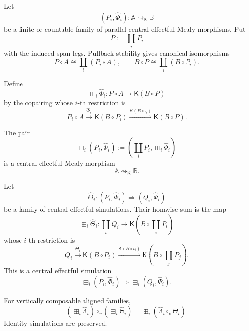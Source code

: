 Let
\[
    (P_i,\widehat\Phi_i):
    \mathbb A\rightsquigarrow_{\mathsf K}\mathbb B
\]
be a finite or countable family of parallel central effectful Mealy
morphisms.  Put
\[
    P:=\coprod_iP_i
\]
with the induced span legs.  Pullback stability gives canonical
isomorphisms
\[
    P\circ A
    \cong
    \coprod_i(P_i\circ A),
    \qquad
    B\circ P
    \cong
    \coprod_i(B\circ P_i).
\]

Define
\[
    \boxplus_i\widehat\Phi_i:
    P\circ A
    \longrightarrow
    \mathsf K(B\circ P)
\]
by the copairing whose \(i\)-th restriction is
\[
    P_i\circ A
    \xrightarrow{\widehat\Phi_i}
    \mathsf K(B\circ P_i)
    \xrightarrow{\mathsf K(B\circ\iota_i)}
    \mathsf K(B\circ P).
\]

\begin{proposition}
\label{prop:homwise-sums-effectful-mealy}
The pair
\[
    \boxplus_i(P_i,\widehat\Phi_i)
    :=
    \left(
        \coprod_iP_i,
        \boxplus_i\widehat\Phi_i
    \right)
\]
is a central effectful Mealy morphism
\[
    \mathbb A\rightsquigarrow_{\mathsf K}\mathbb B.
\]

Let
\[
    \widehat\Theta_i:
    (P_i,\widehat\Phi_i)
    \Rightarrow
    (Q_i,\widehat\Psi_i)
\]
be a family of central effectful simulations.  Their homwise sum is the map
\[
    \boxplus_i\widehat\Theta_i:
    \coprod_iQ_i
    \longrightarrow
    \mathsf K
    \left(
        B\circ\coprod_iP_i
    \right)
\]
whose \(i\)-th restriction is
\[
    Q_i
    \xrightarrow{\widehat\Theta_i}
    \mathsf K(B\circ P_i)
    \xrightarrow{\mathsf K(B\circ\iota_i)}
    \mathsf K
    \left(
        B\circ\coprod_jP_j
    \right).
\]
This is a central effectful simulation
\[
    \boxplus_i(P_i,\widehat\Phi_i)
    \Rightarrow
    \boxplus_i(Q_i,\widehat\Psi_i).
\]

For vertically composable aligned families,
\[
    \left(
        \boxplus_i\widehat\Lambda_i
    \right)
    \circ_v
    \left(
        \boxplus_i\widehat\Theta_i
    \right)
    =
    \boxplus_i
    \left(
        \widehat\Lambda_i\circ_v\widehat\Theta_i
    \right).
\]
Identity simulations are preserved.
\end{proposition}

